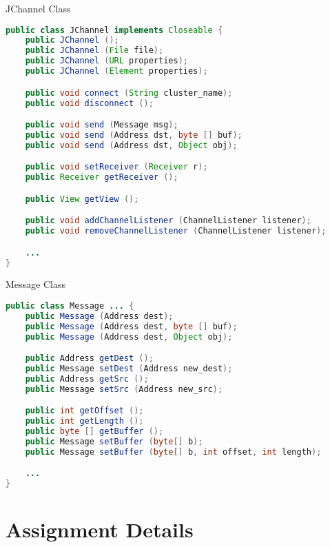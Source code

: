 \begin{frame}[fragile]{JChannel Class}
\begin{lstlisting}[language=java,style=mini]
public class JChannel implements Closeable {
    public JChannel ();
    public JChannel (File file);
    public JChannel (URL properties);
    public JChannel (Element properties);

    public void connect (String cluster_name);
    public void disconnect ();

    public void send (Message msg);
    public void send (Address dst, byte [] buf);
    public void send (Address dst, Object obj);

    public void setReceiver (Receiver r);
    public Receiver getReceiver ();

    public View getView ();

    public void addChannelListener (ChannelListener listener);
    public void removeChannelListener (ChannelListener listener);

    ...
}
\end{lstlisting}
\end{frame}


\begin{frame}[fragile]{Message Class}
\begin{lstlisting}[language=java,style=mini]
public class Message ... {
    public Message (Address dest);
    public Message (Address dest, byte [] buf);
    public Message (Address dest, Object obj);

    public Address getDest ();
    public Message setDest (Address new_dest);
    public Address getSrc ();
    public Message setSrc (Address new_src);

    public int getOffset ();
    public int getLength ();
    public byte [] getBuffer ();
    public Message setBuffer (byte[] b);
    public Message setBuffer (byte[] b, int offset, int length);

    ...
}
\end{lstlisting}
\end{frame}


\section{Assignment Details}


